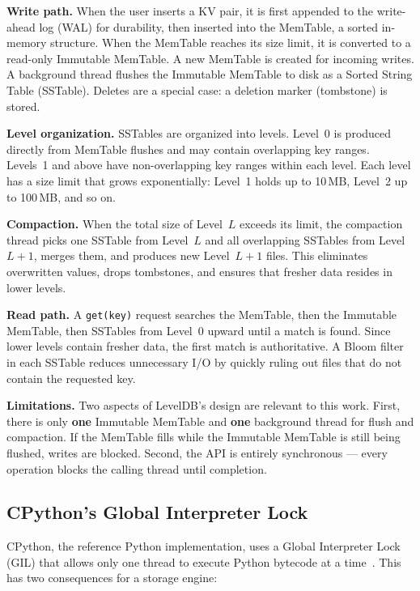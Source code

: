 \documentclass[conference]{IEEEtran}
\begin{document}
\textbf{Write path.} When the user inserts a KV pair, it is first appended to the write-ahead log (WAL) for durability, then inserted into the MemTable, a sorted in-memory structure. When the MemTable reaches its size limit, it is converted to a read-only Immutable MemTable. A new MemTable is created for incoming writes. A background thread flushes the Immutable MemTable to disk as a Sorted String Table (SSTable). Deletes are a special case: a deletion marker (tombstone) is stored.

\textbf{Level organization.} SSTables are organized into levels. Level~0 is produced directly from MemTable flushes and may contain overlapping key ranges. Levels~1 and above have non-overlapping key ranges within each level. Each level has a size limit that grows exponentially: Level~1 holds up to 10\,MB, Level~2 up to 100\,MB, and so on.

\textbf{Compaction.} When the total size of Level~$L$ exceeds its limit, the compaction thread picks one SSTable from Level~$L$ and all overlapping SSTables from Level~$L{+}1$, merges them, and produces new Level~$L{+}1$ files. This eliminates overwritten values, drops tombstones, and ensures that fresher data resides in lower levels.

\textbf{Read path.} A \texttt{get(key)} request searches the MemTable, then the Immutable MemTable, then SSTables from Level~0 upward until a match is found. Since lower levels contain fresher data, the first match is authoritative. A Bloom filter~\cite{bloom1970} in each SSTable reduces unnecessary I/O by quickly ruling out files that do not contain the requested key.

\textbf{Limitations.} Two aspects of LevelDB's design are relevant to this work. First, there is only \textbf{one} Immutable MemTable and \textbf{one} background thread for flush and compaction. If the MemTable fills while the Immutable MemTable is still being flushed, writes are blocked. Second, the API is entirely synchronous --- every operation blocks the calling thread until completion.

\subsection{CPython's Global Interpreter Lock}

CPython, the reference Python implementation, uses a Global Interpreter Lock (GIL) that allows only one thread to execute Python bytecode at a time~\cite{python-gil}. This has two consequences for a storage engine:
\end{document}
